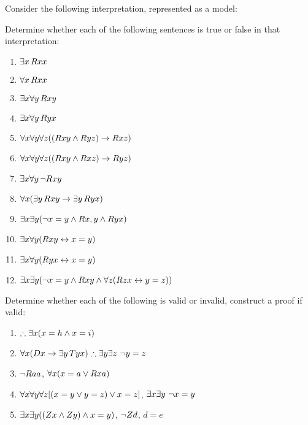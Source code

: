 \leibniz
\practiceproblems
\problempart
\label{pr.TorF3}
Consider the following interpretation, represented as a model:	
\begin{center}
\end{center}
Determine whether each of the following sentences is true or false in that interpretation:
\begin{enumerate}
\item $\exists x\, \mathord{R}xx$
\item $\forall x\, \mathord{R}xx$
\item $\exists x \forall y\, \mathord{R}xy$
\item $\exists x \forall y\, \mathord{R}yx$
\item $\forall x \forall y \forall z ((\mathord{R}xy \wedge \mathord{R}yz) \rightarrow \mathord{R}xz)$
\item $\forall x \forall y \forall z ((\mathord{R}xy \wedge \mathord{R}xz) \rightarrow \mathord{R}yz)$
\item $\exists x \forall y\, \neg \mathord{R}xy$
\item $\forall x(\exists y\, \mathord{R}xy \rightarrow \exists y\, \mathord{R}yx)$
\item $\exists x \exists y (\neg x = y \wedge \mathord{R}x,y \wedge \mathord{R}yx)$
\item $\exists x \forall y(\mathord{R}xy \leftrightarrow x = y)$
\item $\exists x \forall y(\mathord{R}yx \leftrightarrow x = y)$
\item $\exists x \exists y(\neg x = y \wedge \mathord{R}xy \wedge \forall z(\mathord{R}zx \leftrightarrow y = z))$
\end{enumerate}
\problempart
Determine whether each of the following is valid or invalid, construct a proof if valid:
\begin{enumerate}
\item $\therefore \exists x (x = h \eand x = i)$
\item $\forall x(\atom{D}{x} \eif \exists y\, \atom{T}{yx}) \therefore \exists y \exists z\ \enot y= z$
\item $\neg \mathord{R}aa$, $\forall x (x=a \vee \mathord{R}xa)$
\item $\forall x\forall y\forall z[(x=y \vee y=z )\vee x=z]$, $\exists x\exists y\ \enot x= y$
\item $\exists x\exists y((\mathord{Z}x \wedge \mathord{Z}y )\wedge x=y)$, $\neg \mathord{Z}d$, $d=e$
\end{enumerate}




